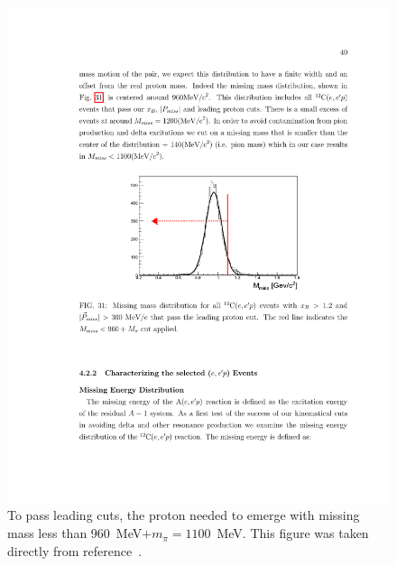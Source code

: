 \documentclass{article}
\begin{document}
\begin{figure}[htpb]
\centering
\includegraphics{or_note_figs/m_miss.pdf}
\caption[Missing mass cut]{
To pass leading cuts, the proton needed to emerge with missing mass less than
960~MeV$+m_\pi=1100$~MeV. This figure was taken directly from reference~\cite{Or:note}.
\label{fig:m_miss}
}
\end{figure}
\end{document}
